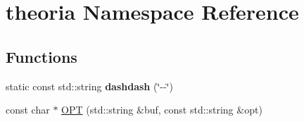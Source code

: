 \hypertarget{namespacetheoria}{}\section{theoria Namespace Reference}
\label{namespacetheoria}
\subsection*{Functions}
\begin{DoxyCompactItemize}
\item 
\mbox{\label{namespacetheoria_a2461ee397964667138bdba02d62d209e}} 
static const std\+::string {\bfseries dashdash} (\char`\"{}-\/-\/\char`\"{})
\item 
const char $\ast$ \hyperlink{namespacetheoria_ad064111544bc341abc915fd30ee47659}{O\+PT} (std\+::string \&buf, const std\+::string \&opt)
\end{DoxyCompactItemize}
